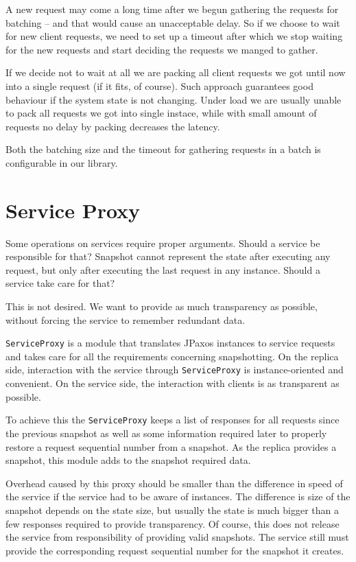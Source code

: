 A new request may come a long time after we begun gathering the requests for batching -- and that would cause an unacceptable delay. So if we choose to wait for new client requests, we need to set up a timeout after which we stop waiting for the new requests and start deciding the requests we manged to gather. %

If we decide not to wait at all we are packing all client requests we got until now into a single request (if it fits, of course). Such approach guarantees good behaviour if the system state is not changing. Under load  we are usually unable to pack all requests we got into single instace, while with small amount of requests no delay by packing decreases the latency.

Both the batching size and the timeout for gathering requests in a batch is configurable in our library.

\section{Service Proxy}
\label{sec:serviceProxy}

Some operations on services require proper arguments. Should a service be responsible for that? Snapshot cannot represent the state after executing any request, but only after executing the last request in any instance. Should a service take care for that?

This is not desired. We want to provide as much transparency as possible, without forcing the service to remember redundant data.

\texttt{ServiceProxy} is a module that translates JPaxos instances to service requests and takes care for all the requirements concerning snapshotting. On the replica side, interaction with the service through \texttt{ServiceProxy} is instance-oriented and convenient. On the service side, the interaction with clients is as transparent as possible.

To achieve this the \texttt{ServiceProxy} keeps a list of responses for all requests since the previous snapshot as well as some information required later to properly restore a
request sequential number %
from a snapshot.
As the replica provides a snapshot, this module adds to the snapshot required data.

Overhead caused by this proxy should be smaller than the difference in speed of the service if the service had to be aware of instances. The difference is size of the snapshot depends on the state size, but usually the state is much bigger than a few responses required to provide transparency.
Of course, this does not release the service from responsibility of providing valid snapshots. The service still must provide the corresponding 
request sequential number %
for the snapshot it creates.

